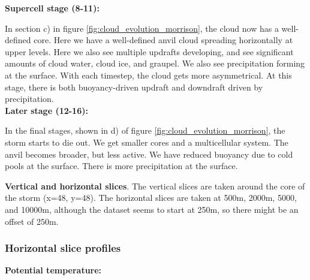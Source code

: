 \documentclass{article}
\begin{document}
\textbf{Supercell stage (8-11):}

In section c) in figure \ref{fig:cloud_evolution_morrison}, the cloud now has a well-defined core. 
Here we have a well-defined anvil cloud spreading horizontally at upper levels. Here we also see multiple updrafts developing, and see significant amounts of cloud water, cloud ice, and graupel. We also see precipitation forming at the surface. With each timestep, the cloud gets more asymmetrical. At this stage, there is both buoyancy-driven updraft and downdraft driven by precipitation. \\

\textbf{Later stage (12-16):}

In the final stages, shown in d) of figure \ref{fig:cloud_evolution_morrison}, the storm starts to die out. We get smaller cores and a multicellular system. The anvil becomes broader, but less active. We have reduced buoyancy due to cold pools at the surface. There is more precipitation at the surface. 

\textbf{Vertical and horizontal slices}. The vertical slices are taken around the core of the storm (x=48, y=48). The horizontal slices are taken at 500m, 2000m, 5000, and 10000m, although the dataset seems to start at 250m, so there might be an offset of 250m. \\


\subsubsection*{Horizontal slice profiles}

\textbf{Potential temperature:}
\end{document}
